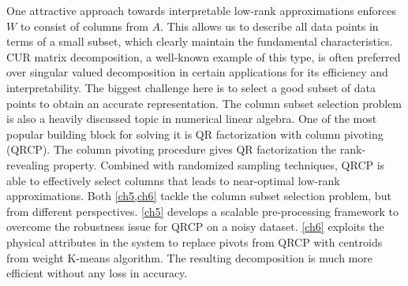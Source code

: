 One attractive approach towards interpretable low\hyp{}rank approximations
enforces $W$ to consist of columns from $A$. This allows us to describe all data
points in terms of a small subset, which clearly maintain the fundamental
characteristics. CUR matrix decomposition, a well\hyp{}known example of this
type, is often preferred over singular valued decomposition in certain
applications for its efficiency and interpretability. The biggest challenge here
is to select a good subset of data points to obtain an accurate representation.
The column subset selection problem is also a heavily discussed topic in
numerical linear algebra\cite{boutsidis2009improved,deshpande2010efficient}. One
of the most popular building block for solving it is QR factorization with
column pivoting (QRCP). The column pivoting procedure gives QR factorization the
rank\hyp{}revealing property. Combined with randomized sampling techniques, QRCP
is able to effectively select columns that leads to near\hyp{}optimal 
low\hyp{}rank approximations. Both \cref{ch5,ch6} tackle the column subset
selection problem, but from different perspectives. \cref{ch5} develops a
scalable pre\hyp{}processing framework to overcome the robustness issue for QRCP
on a noisy dataset. \cref{ch6} exploits the physical attributes in the system to
replace pivots from QRCP with centroids from weight K\hyp{}means algorithm. The
resulting decomposition is much more efficient without any loss in accuracy.